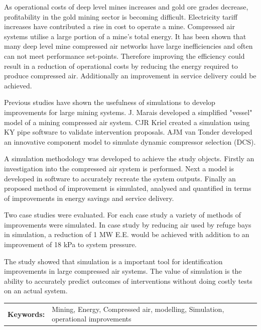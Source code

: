 \documentclass[12pt, english, oneside, open=any]{report}
\begin{document}
	 As operational costs of deep level mines increases and gold ore grades decrease, profitability in the gold mining sector is becoming difficult. Electricity tariff increases have contributed a rise in cost to operate a mine.  Compressed air systems utilise a large portion of a mine's total energy. It has been shown that many deep level mine compressed air networks have large inefficiencies and often can not meet performance set-points. Therefore improving the efficiency could result in a reduction of operational costs by reducing the energy required to produce compressed air. Additionally an improvement in service delivery could be achieved. \par
	Previous studies have shown the usefulness of simulations to develop improvements for large mining systems.  J. Marais developed  a simplified "vessel" model of a mining compressed air system. CJR Kriel created a simulation using KY pipe software to validate intervention proposals. AJM van Tonder developed an innovative component model to simulate dynamic compressor  selection (DCS). \par
	A simulation methodology was developed to achieve the study objects. Firstly an investigation into the compressed air system is performed. Next a model is developed in software to accurately recreate the system outputs. Finally an proposed method of improvement is simulated, analysed and quantified in terms of improvements in energy savings and service delivery.\par
	 Two case studies were evaluated. For each case study a variety of methods of improvements were simulated. In case study by reducing air used by refuge bays in simulation, a reduction of 1 MW E.E. would be achieved with addition to an improvement of 18 kPa to system pressure.\par
	 The study showed that simulation is a important tool for identification improvements in large compressed air systems. The value of simulation is the ability to accurately predict outcomes of interventions without doing costly tests on an actual system. \\
	 \vspace{2cm}
	\begin{tabular}{p{2.35cm}p{13.35cm}}
		\textbf{Keywords:} & Mining, Energy, Compressed air, modelling, Simulation, operational improvements  \\
	\end{tabular}
\clearpage

\setcounter{page}{3}
\begin{spacing}{0.2} 
\tableofcontents

\clearpage


	\printglossary[type=\acronymtype,title=Abbreviations, nonumberlist]
	\printglossary[title=Nomenclature, nonumberlist]
	\newpage
	\listoffigures
	\listoftables
\end{spacing}	









\end{document}
